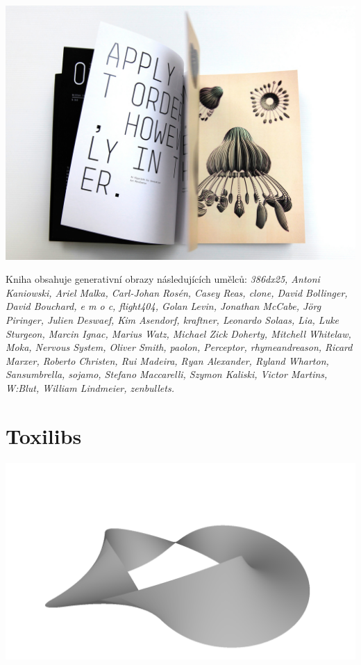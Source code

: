 \documentclass[10pt,twoside=true,open=right,cleardoublepage=empty,chapterprefix=true]{scrbook}
\newcommand{\oddil}[1]{\section{#1}\index{#1}\label{#1}}
\newcommand{\lnb}{\linebreak}
\begin{document}
\begin{centering}
\includegraphics[width = 1\textwidth]{imgs/writtenimages.png}
\end{centering}

Kniha obsahuje generativní obrazy následujících umělců:
{\em 
386dx25, \lnb Antoni Kaniowski, Ariel Malka, Carl-Johan Rosén, Casey Reas, clone, \lnb David Bollinger, David Bouchard, e m o c, flight404, Golan Levin, \lnb Jonathan McCabe, Jörg Piringer, Julien Deswaef, Kim Asendorf, kraftner, Leonardo Solaas, Lia, Luke Sturgeon, Marcin Ignac, Marius Watz, Michael Zick Doherty, Mitchell Whitelaw, Moka, Nervous System, Oliver Smith, \lnb paolon, Perceptor, rhymeandreason, Ricard Marxer, Roberto Christen, Rui Madeira, Ryan Alexander, Ryland Wharton, Sansumbrella, sojamo, \lnb Stefano Maccarelli, Szymon Kaliski, Victor Martins, W:Blut, William \lnb Lindmeier, zenbullets.} 




\newpage
\oddil{Toxilibs}


\begin{center}
\includegraphics[width = 1\textwidth]{imgs/moebius.png}

\end{center}
\end{document}

